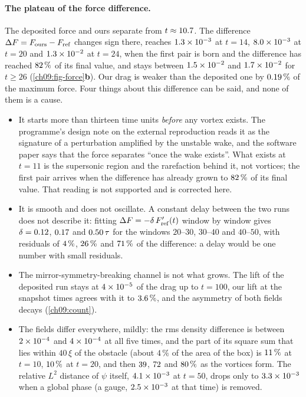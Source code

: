 \paragraph{The plateau of the force difference.} The deposited force and ours separate from $t\approx10.7$. The difference $\Delta F=F_{\rm ours}-F_{\rm ref}$ changes sign there, reaches $1.3\times10^{-3}$ at $t=14$, $8.0\times10^{-3}$ at $t=20$ and $1.3\times10^{-2}$ at $t=24$, when the first pair is born and the difference has reached $82\,\%$ of its final value, and stays between $1.5\times10^{-2}$ and $1.7\times10^{-2}$ for $t\ge26$ (\cref{ch09:fig-force}\textbf{b}). Our drag is weaker than the deposited one by $0.19\,\%$ of the maximum force. Four things about this difference can be said, and none of them is a cause.
\begin{itemize}
\item It starts more than thirteen time units \emph{before} any vortex exists. The programme's design note on the external reproduction reads it as the signature of a perturbation amplified by the unstable wake, and the software paper \cite{Callens2026sw} says that the force separates ``once the wake exists''. What exists at $t=11$ is the supersonic region and the rarefaction behind it, not vortices; the first pair arrives when the difference has already grown to $82\,\%$ of its final value. That reading is not supported and is corrected here.
\item It is smooth and does not oscillate. A constant delay between the two runs does not describe it: fitting $\Delta F=-\delta\,F_{\rm ref}'(t)$ window by window gives $\delta=0.12$, $0.17$ and $0.50\,\tau$ for the windows $20$--$30$, $30$--$40$ and $40$--$50$, with residuals of $4\,\%$, $26\,\%$ and $71\,\%$ of the difference: a delay would be one number with small residuals.
\item The mirror-symmetry-breaking channel is not what grows. The lift of the deposited run stays at $4\times10^{-5}$ of the drag up to $t=100$, our lift at the snapshot times agrees with it to $3.6\,\%$, and the asymmetry of both fields decays (\cref{ch09:count}).
\item The fields differ everywhere, mildly: the rms density difference is between $2\times10^{-4}$ and $4\times10^{-4}$ at all five times, and the part of its square sum that lies within $40\,\xi$ of the obstacle (about $4\,\%$ of the area of the box) is $11\,\%$ at $t=10$, $10\,\%$ at $t=20$, and then $39$, $72$ and $80\,\%$ as the vortices form. The relative $L^2$ distance of $\psi$ itself, $4.1\times10^{-3}$ at $t=50$, drops only to $3.3\times10^{-3}$ when a global phase (a gauge, $2.5\times10^{-3}$ at that time) is removed.
\end{itemize}
